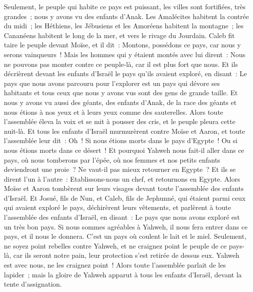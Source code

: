 \begin{multicols}{2}
Seulement, le peuple qui habite ce pays est puissant, les villes sont fortifiées, très grandes~; nous y avons vu des enfants d'Anak.
Les Amalécites habitent la contrée du midi~; les Héthiens, les Jébusiens et les Amoréens habitent la montagne~; les Cananéens habitent le long de la mer, et vers le rivage du Jourdain.
Caleb fit taire le peuple devant Moïse, et il dit~: Montons, possédons ce pays, car nous y serons vainqueurs~!
Mais les hommes qui y étaient montés avec lui dirent~: Nous ne pouvons pas monter contre ce peuple-là, car il est plus fort que nous.
Et ils décrièrent devant les enfants d'Israël le pays qu'ils avaient exploré, en disant~: Le pays que nous avons parcouru pour l'explorer est un pays qui dévore ses habitants et tous ceux que nous y avons vus sont des gens de grande taille.
Et nous y avons vu aussi des géants, des enfants d'Anak, de la race des géants et nous étions à nos yeux et à leurs yeux comme des sauterelles.
\VerseOne{}Alors toute l'assemblée éleva la voix et se mit à pousser des cris, et le peuple pleura cette nuit-là.
Et tous les enfants d'Israël murmurèrent contre Moïse et Aaron, et toute l'assemblée leur dit~: Oh~! Si nous étions morts dans le pays d'Egypte~! Ou si nous étions morts dans ce désert~!
Et pourquoi Yahweh nous fait-il aller dans ce pays, où nous tomberons par l'épée, où nos femmes et nos petits enfants deviendront une proie~? Ne vaut-il pas mieux retourner en Egypte~?
Et ils se dirent l'un à l'autre~: Etablissons-nous un chef, et retournons en Egypte.
Alors Moïse et Aaron tombèrent sur leurs visages devant toute l'assemblée des enfants d'Israël.
Et Josué, fils de Nun, et Caleb, fils de Jephunné, qui étaient parmi ceux qui avaient exploré le pays, déchirèrent leurs vêtements,
et parlèrent à toute l'assemblée des enfants d'Israël, en disant~: Le pays que nous avons exploré est un très bon pays.
Si nous sommes agréables à Yahweh, il nous fera entrer dans ce pays, et il nous le donnera. C'est un pays où coulent le lait et le miel.
Seulement, ne soyez point rebelles contre Yahweh, et ne craignez point le peuple de ce pays-là, car ils seront notre pain, leur protection s'est retirée de dessus eux. Yahweh est avec nous, ne les craignez point~!
Alors toute l'assemblée parlait de les lapider~; mais la gloire de Yahweh apparut à tous les enfants d'Israël, devant la tente d'assignation.

\end{multicols}

